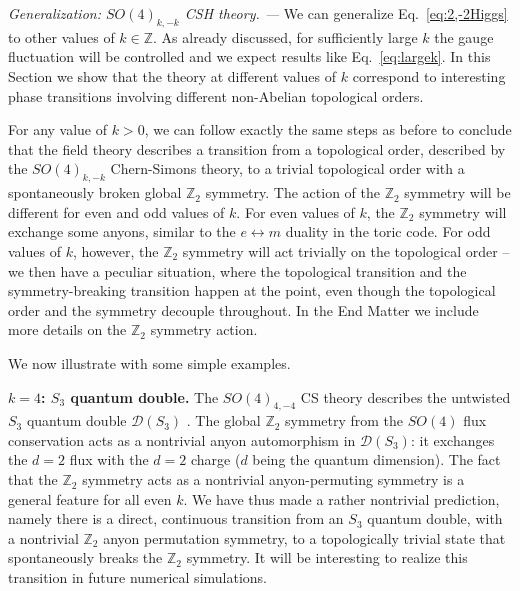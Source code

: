 \documentclass[aps, prl, superscriptaddress, twocolumn,
notitlepage, longbibliography,
floatfix]{revtex4-2}
\newcommand{\1}{\text{\uppercase\expandafter{\romannumeral1}}}
\newcommand{\2}{\text{\uppercase\expandafter{\romannumeral2}}}
\newcommand{\3}{\text{\uppercase\expandafter{\romannumeral3}}}
\newcommand{\4}{\text{\uppercase\expandafter{\romannumeral4}}}
\newcommand{\5}{\text{\uppercase\expandafter{\romannumeral5}}}
\newcommand{\6}{\text{\uppercase\expandafter{\romannumeral6}}}
\def\Z{\mathbb{Z}}
\begin{document}
\textit{Generalization: $SO(4)_{k,-k}$  CSH theory. ---}
We can generalize Eq.~\eqref{eq:2,-2Higgs} to other values of $k\in\Z$. As already discussed, for sufficiently large $k$ the gauge fluctuation will be controlled and we expect results like Eq.~\eqref{eq:largek}. In this Section we show that the theory at different values of $k$ correspond to interesting phase transitions involving different non-Abelian topological orders.

For any value of $k>0$, we can follow exactly the same steps as before to conclude that the field theory describes a transition from a topological order, described by the $SO(4)_{k,-k}$ Chern-Simons theory, to a trivial topological order with a spontaneously broken global $\Z_2$ symmetry. The action of the $\Z_2$ symmetry will be different for even and odd values of $k$. For even values of $k$, the $\Z_2$ symmetry will exchange some anyons, similar to the $e\leftrightarrow m$ duality in the toric code.  For odd values of $k$, however, the $\Z_2$ symmetry will act trivially on the topological order -- we then have a peculiar situation, where the topological transition and the symmetry-breaking transition happen at the point, even though the topological order and the symmetry decouple throughout. In the End Matter we include more details on the $\Z_2$ symmetry action.

We now illustrate with some simple examples.


\textbf{\boldmath $k=4$: $S_3$ quantum double.} The $SO(4)_{4,-4}$ CS theory describes the untwisted $S_3$ quantum double $\mathcal{D}(S_3)$ \cite{bais2009condensate}. The global $\Z_2$ symmetry from the $SO(4)$ flux conservation acts as a nontrivial anyon automorphism in $\mathcal{D}(S_3)$: it exchanges the $d=2$ flux with the $d=2$ charge ($d$ being the quantum dimension). The fact that the $\Z_2$ symmetry acts as a nontrivial anyon-permuting symmetry is a general feature for all even $k$. We have thus made a rather nontrivial prediction, namely there is a direct, continuous transition from an $S_3$ quantum double, with a nontrivial $\Z_2$ anyon permutation symmetry, to a topologically trivial state that spontaneously breaks the $\Z_2$ symmetry. It will be interesting to realize this transition in future numerical simulations.
\end{document}
